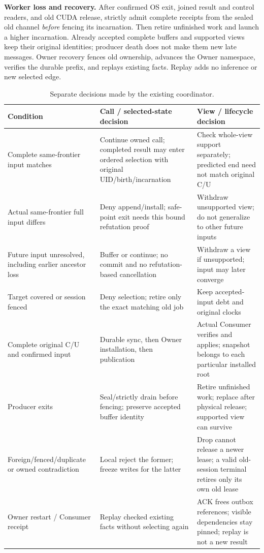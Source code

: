 \documentclass[10pt]{article}
\begin{document}
\textbf{Worker loss and recovery.} After confirmed OS exit, joined result
and control readers, and old CUDA release, strictly admit complete receipts
from the sealed old channel \emph{before} fencing its incarnation. Then
retire unfinished work and launch a higher incarnation. Already accepted
complete buffers and supported views keep their original identities;
producer death does not make them new late messages. Owner recovery fences
old ownership, advances the Owner namespace, verifies the durable prefix,
and replays existing facts. Replay adds no inference or new selected edge.

\begin{table}[h]
\centering\small
\caption{Separate decisions made by the existing coordinator.}
\renewcommand{\arraystretch}{1.16}
\begin{tabularx}{\linewidth}{@{}>{\raggedright\arraybackslash}p{.24\linewidth}>{\raggedright\arraybackslash}X>{\raggedright\arraybackslash}X@{}}
\toprule
Condition & Call / selected-state decision & View / lifecycle decision\\
\midrule
Complete same-frontier input matches & Continue owned call; completed
result may enter ordered selection with original UID/birth/incarnation &
Check whole-view support separately; predicted end need not match original C/U\\
Actual same-frontier full input differs & Deny append/install; safe-point
exit needs this bound refutation proof & Withdraw unsupported view; do not
generalize to other future inputs\\
Future input unresolved, including earlier ancestor loss & Buffer or
continue; no commit and no refutation-based cancellation & Withdraw a view
if unsupported; input may later converge\\
Target covered or session fenced & Deny selection; retire only the exact
matching old job & Keep accepted-input debt and original clocks\\
Complete original C/U and confirmed input & Durable sync, then Owner
installation, then publication & Actual Consumer verifies and applies;
snapshot belongs to each particular installed root\\
Producer exits & Seal/strictly drain before fencing; preserve accepted
buffer identity & Retire unfinished work; replace after physical release;
supported view can survive\\
Foreign/fenced/duplicate or owned contradiction & Local reject the former;
freeze writes for the latter & Drop cannot release a newer lease; a valid
old-session terminal retires only its own old lease\\
Owner restart / Consumer receipt & Replay checked existing facts without
selecting again & ACK frees outbox references; visible dependencies stay
pinned; replay is not a new result\\
\bottomrule
\end{tabularx}
\end{table}
\end{document}
